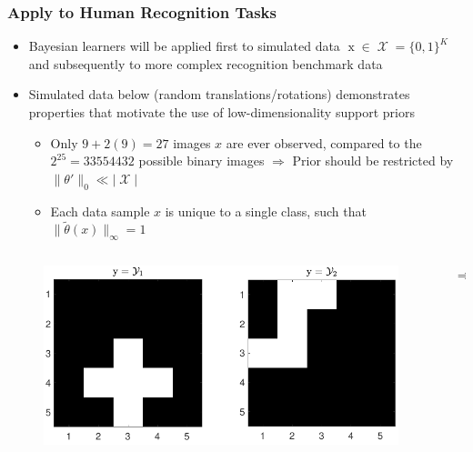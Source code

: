 \documentclass[aspectratio=169,usenames,dvipsnames]{beamer}
\DeclareMathOperator{\xrm}{\mathrm{x}}
\DeclareMathOperator{\Xcal}{\mathcal{X}}
\begin{document}
\begin{frame}
\frametitle{Apply to Human Recognition Tasks}

\begin{itemize}
\item Bayesian learners will be applied first to \alert{simulated data} $\xrm \in \Xcal = \{0,1\}^K$ and subsequently to more complex recognition \alert{benchmark data}
\vspace{0.5em}
\item Simulated data below (random translations/rotations) demonstrates properties that motivate the use of \alert{low-dimensionality support} priors
	\vspace{0.25em}
	\begin{itemize}
	\item Only $9+2(9) = 27$ images $x$ are ever observed, compared to the $2^{25} = 33554432$ possible binary images $\Rightarrow$ Prior should be restricted by $\big\| \theta' \big\|_0 \ll |\Xcal|$ 
	\vspace{0.25em}
	\item Each data sample $x$ is unique to a single class, such that $\big\| \tilde{\theta}(x) \big\|_{\infty} = 1$
	\end{itemize}
\end{itemize}


\begin{columns}[c]
\hspace{2ex}
\begin{column}{.4\linewidth}
\begin{figure}
\centering
\includegraphics[width=1\linewidth]{character_sim_ex.pdf}
\end{figure}
\end{column}

\begin{column}{0.03\linewidth}
\Huge
$\Rightarrow$
\normalsize
\end{column}


\end{columns}
\end{frame}
\end{document}

